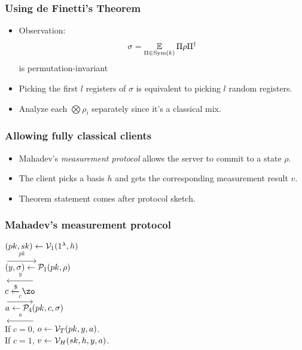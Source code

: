 \documentclass{beamer}
\begin{document}
\begin{frame}
	\frametitle{Using de Finetti's Theorem}
	\begin{itemize}
		\item Observation: $$\sigma=\operatorname*{\mathbb{E}}_{\Pi\in\operatorname{Sym}(k)}\Pi\rho\Pi^\dag$$ is permutation-invariant
		\item Picking the first $l$ registers of $\sigma$ is equivalent to picking $l$ random registers.
		\item Analyze each $\bigotimes\rho_i$ separately since it's a classical mix.
	\end{itemize}
\end{frame}

\begin{frame}
	\frametitle{Allowing fully classical clients}
	\begin{itemize}
		\item Mahadev's \emph{measurement protocol} allows the server to commit to a state $\rho$.
		\item The client picks a basis $h$ and gets the corresponding measurement result $v$.
		\item Theorem statement comes after protocol sketch.
	\end{itemize}
\end{frame}

\begin{frame}
	\frametitle{Mahadev's measurement protocol}
	$(pk, sk)\leftarrow\mathcal{V}_1(1^\lambda, h)$
	\pause
	\\\hspace*{\fill}$\xrightarrow{\qquad pk\qquad}$\hspace*{\fill}
	\pause
	\\\hspace*{\fill}$(y, \sigma)\leftarrow\mathcal{P}_1(pk, \rho)$
	\pause
	\\\hspace*{\fill}$\xleftarrow{\qquad y\qquad}$\hspace*{\fill}
	\pause
	\\$c\xleftarrow{\$}\zo$
	\pause
	\\\hspace*{\fill}$\xrightarrow{\qquad c\qquad}$\hspace*{\fill}
	\pause
	\\\hspace*{\fill}$a\leftarrow\mathcal{P}_4(pk, c, \sigma)$
	\pause
	\\\hspace*{\fill}$\xleftarrow{\qquad a\qquad}$\hspace*{\fill}
	\pause
	\\If $c=0$, $o\leftarrow\mathcal{V}_T(pk, y, a)$.
	\pause
	\\If $c=1$, $v\leftarrow\mathcal{V}_H(sk, h, y, a)$.
\end{frame}
\end{document}
